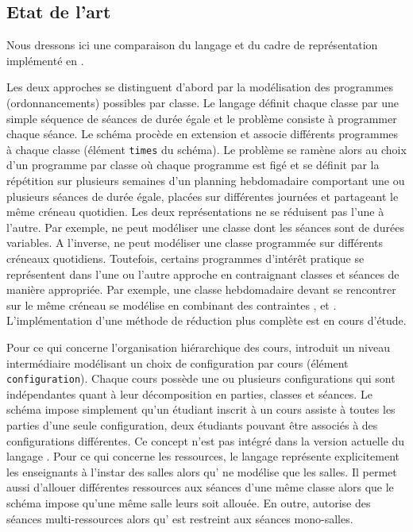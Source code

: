 \subsection{Etat de l'art}
\label{2022_JFPC/etat_art}
Nous dressons ici une comparaison du langage {\UTP} et du cadre de représentation {\ITC} implémenté en {\XML} \cite{2018muller,ITC2019}.

Les deux approches se distinguent d'abord par la modélisation des programmes (ordonnancements) possibles par classe.
Le langage {\UTP} définit chaque classe par une simple séquence de séances de durée égale et le problème consiste à programmer chaque séance.
Le schéma {\ITC} %
procède en extension et associe différents programmes à chaque classe (élément {\texttt{times}} du schéma).
Le problème se ramène alors au choix d'un programme par classe
où chaque programme est figé et se définit par la répétition sur plusieurs semaines d'un planning hebdomadaire comportant une ou plusieurs séances de durée égale, placées sur différentes journées et partageant le même créneau quotidien.
Les deux représentations ne se réduisent pas l'une à l'autre.
Par exemple, {\UTP} ne peut modéliser une classe dont les séances sont de durées variables.
A l'inverse, {\ITC} ne peut modéliser une classe programmée sur différents créneaux quotidiens.
Toutefois, certains programmes d'intérêt pratique se représentent dans l'une ou l'autre approche en contraignant classes et séances de manière appropriée.
Par exemple, une classe hebdomadaire devant se rencontrer sur le même créneau se modélise en combinant des contraintes \texttt{\SAMEDAILYSLOT}, \texttt{\WEEKLY} et \texttt{\FORBIDDENPERIOD}.
L'implémentation d'une méthode de réduction plus complète %
est en cours d'étude.

Pour ce qui concerne l'organisation hiérarchique des cours, 
{\ITC} introduit un niveau intermédiaire modélisant un choix de configuration par cours (élément {\texttt{configuration}}).
Chaque cours possède une ou plusieurs configurations qui sont indépendantes quant à leur décomposition en parties, classes et séances. 
Le schéma {\ITC} impose simplement qu'un étudiant inscrit à un cours assiste à toutes les parties d'une seule configuration, deux étudiants pouvant être associés à des configurations différentes. %
Ce concept n'est pas intégré dans la version actuelle du langage {\UTP}.
Pour ce qui concerne les ressources, le langage {\UTP} représente explicitement les enseignants à l'instar des salles alors qu'{\ITC} ne modélise que les salles.
Il permet aussi d'allouer différentes ressources aux séances d'une même classe 
alors que le schéma {\ITC} impose qu'une même salle leurs soit allouée.
En outre, {\UTP} autorise des séances multi-ressources alors qu'{\ITC} est restreint aux séances mono-salles.


